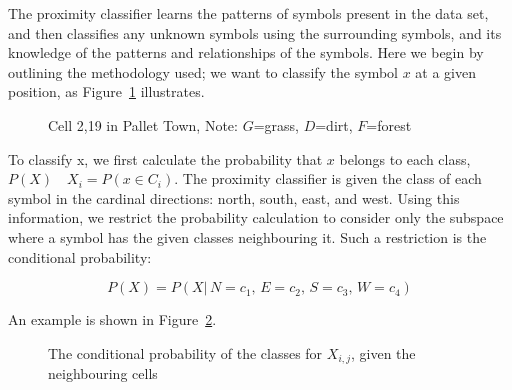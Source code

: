 
The proximity classifier learns the patterns of symbols present in the data set,
and then classifies any unknown symbols using the surrounding symbols, and its
knowledge of the patterns and relationships of the symbols. Here we begin by
outlining the methodology used; we want to classify the symbol $x$ at a given
position, as Figure~\ref{fig:neighbours} illustrates.

\begin{figure}[h]
\begin{center}
\end{center}
\caption{Cell 2,19 in Pallet Town, Note: $G$=grass, $D$=dirt, $F$=forest}
\label{fig:neighbours}
\end{figure}

To classify x, we first calculate the probability that $x$ belongs to each
class, $P(X)\quad X_i = P(x\!\in\! C_i)$. The proximity classifier is given the
class of each symbol in the cardinal directions: north, south, east, and west.
Using this information, we restrict the probability calculation to consider
only the subspace where a symbol has the given classes neighbouring it. Such a
restriction is the conditional probability:

\[
P(X) = P(X|\,N\!=\!c_1,\,E\!=\!c_2,\,S\!=\!c_3,\,W\!=\!c_4)
\]

An example is shown in Figure~\ref{fig:conditionalprob}.

\begin{figure}[h]
\begin{center}
\end{center}
\caption{The conditional probability of the classes for $X_{i,j}$, given the neighbouring cells}
\label{fig:conditionalprob}
\end{figure}


